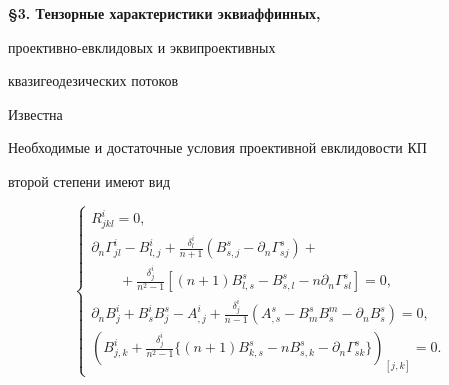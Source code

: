\medskip





\begin{center}


{\bf \S 3. Тензорные характеристики эквиаффинных,


проективно-евклидовых и эквипроективных


квазигеодезических потоков}


\end{center}


\medskip





Известна





\begin{thm}


Необходимые и достаточные условия проективной евклидовости КП


второй степени имеют вид


\begin{equation}


\begin{cases}


R^{i}_{jkl} =0,\\


\partial_n \Gamma^i_{jl}-B^i_{l,j}+\frac{\delta^i_l}{n+1}


(B^s_{s,j}-\partial_n \Gamma^s_{sj})+\\


\qquad +\frac{\delta^i_j}{n^2-1}


[(n+1)B^s_{l,s}-B^s_{s,l}-n \partial_n\Gamma^s_{sl}]=0,\\


\partial_n B^i_{j}+B^i_s B^s_j-A^i_{,j}+\frac{\delta^i_j}{n-1}


(A^s_{,s} -B^s_{m}B^m_{s}- \partial_n B^s_{s})=0,\\


(B^i_{j,k}+\frac{\delta^i_j}{n^2-1}\{(n+1)B^s_{k,s} -nB^s_{s,k}-


\partial_n \Gamma^s_{sk}\})_{[j,k]}=0.


\end{cases}


\end{equation}


\end{thm}





